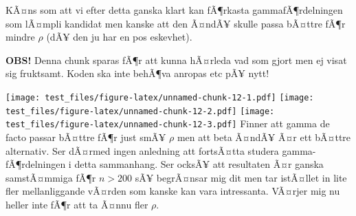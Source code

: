 \documentclass[]{article}
\newenvironment{Shaded}{\begin{snugshade}}{\end{snugshade}}
\newcommand{\KeywordTok}[1]{\textcolor[rgb]{0.13,0.29,0.53}{\textbf{{#1}}}}
\newcommand{\DataTypeTok}[1]{\textcolor[rgb]{0.13,0.29,0.53}{{#1}}}
\newcommand{\DecValTok}[1]{\textcolor[rgb]{0.00,0.00,0.81}{{#1}}}
\newcommand{\StringTok}[1]{\textcolor[rgb]{0.31,0.60,0.02}{{#1}}}
\newcommand{\NormalTok}[1]{{#1}}
\begin{document}
KÃ¤ns som att vi efter detta ganska klart kan fÃ¶rkasta
gammafÃ¶rdelningen som lÃ¤mpli kandidat men kanske att den Ã¤ndÃ¥ skulle
passa bÃ¤ttre fÃ¶r mindre \(\rho\) (dÃ¥ den ju har en pos eskevhet).

\textbf{OBS!} Denna chunk sparas fÃ¶r att kunna hÃ¤rleda vad som gjort
men ej visat sig fruktsamt. Koden ska inte behÃ¶va anropas etc pÃ¥ nytt!

\begin{Shaded}
\end{Shaded}

\texttt{[image: test\_files/figure-latex/unnamed-chunk-12-1.pdf]}
\texttt{[image: test\_files/figure-latex/unnamed-chunk-12-2.pdf]}
\texttt{[image: test\_files/figure-latex/unnamed-chunk-12-3.pdf]} Finner
att gamma de facto passar bÃ¤ttre fÃ¶r just smÃ¥ \(\rho\) men att beta
Ã¤ndÃ¥ Ã¤r ett bÃ¤ttre alternativ. Ser dÃ¤rmed ingen anledning att
fortsÃ¤tta studera gamma-fÃ¶rdelningen i detta sammanhang. Ser ocksÃ¥
att resultaten Ã¤r ganska samstÃ¤mmiga fÃ¶r \(n> 200\) sÃ¥ begrÃ¤nsar
mig dit men tar istÃ¤llet in lite fler mellanliggande vÃ¤rden som kanske
kan vara intressanta. VÃ¤rjer mig nu heller inte fÃ¶r att ta Ã¤nnu fler
\(\rho\).
\end{document}
